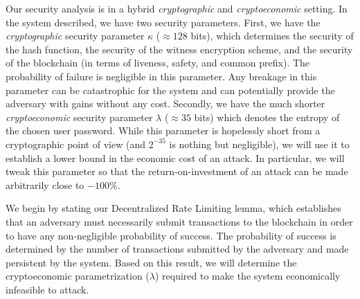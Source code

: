 Our security analysis is in a hybrid \emph{cryptographic} and \emph{cryptoeconomic}
setting.
In the system described, we have two security parameters. First, we have
the \emph{cryptographic} security
parameter $\kappa$ ($\approx 128$ bits), which determines the security of the hash function,
the security of the witness encryption scheme, and the security of the blockchain (in terms
of liveness, safety, and common prefix). The probability of failure is negligible in this
parameter. Any breakage in this parameter can be catastrophic for the system and
can potentially provide the adversary with gains without any cost.
Secondly, we have the much shorter \emph{cryptoeconomic} security parameter $\lambda$
($\approx 35$ bits) which denotes the entropy of the chosen user password.
While this parameter is hopelessly short from a cryptographic
point of view (and $2^{-35}$ is nothing but negligible), we will use it to establish
a lower bound in the economic cost of an attack. In particular, we will tweak this
parameter so that the return-on-investment of an attack can be made arbitrarily close
to $-100\%$.

We begin by stating our Decentralized Rate Limiting lemma, which establishes that
an adversary must necessarily submit transactions to the blockchain in order to
have any non-negligible probability of success. The probability of success is
determined by the number of transactions submitted by the adversary and made
persistent by the system. Based on this result, we will determine the cryptoeconomic
parametrization ($\lambda$) required to make the system economically infeasible to attack.

